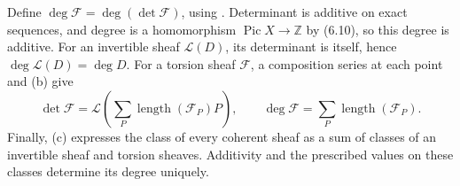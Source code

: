 Define $\deg\mathcal F=\deg(\det\mathcal F)$, using . Determinant is additive on exact sequences, and degree is a homomorphism $\operatorname{Pic}X\to\mathbb Z$ by (6.10), so this degree is additive. For an invertible sheaf $\mathcal L(D)$, its determinant is itself, hence $\deg\mathcal L(D)=\deg D$. For a torsion sheaf $\mathcal F$, a composition series at each point and (b) give
\[\det\mathcal F=\mathcal L\left(\sum_P\operatorname{length}(\mathcal F_P)P\right),\qquad \deg\mathcal F=\sum_P\operatorname{length}(\mathcal F_P).\]
Finally, (c) expresses the class of every coherent sheaf as a sum of classes of an invertible sheaf and torsion sheaves. Additivity and the prescribed values on these classes determine its degree uniquely.
